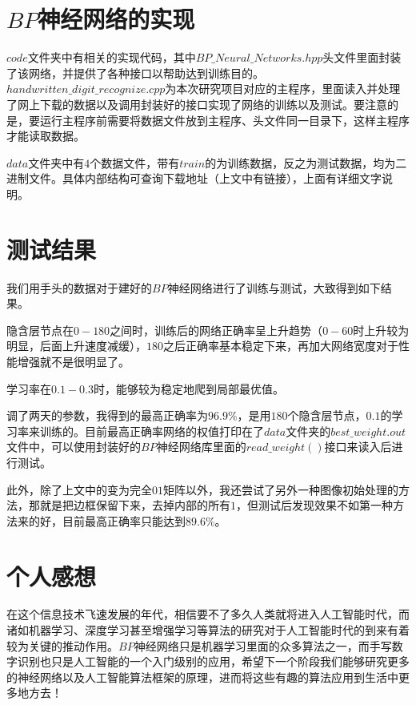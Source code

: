 ﻿\documentclass[UTF8]{ctexart}
\begin{document}
\section{$BP$神经网络的实现}
$code$文件夹中有相关的实现代码，其中$BP\_Neural\_Networks.hpp$头文件里面封装了该网络，并提供了各种接口以帮助达到训练目的。$handwritten\_digit\_recognize.cpp$为本次研究项目对应的主程序，里面读入并处理了网上下载的数据以及调用封装好的接口实现了网络的训练以及测试。要注意的是，要运行主程序前需要将数据文件放到主程序、头文件同一目录下，这样主程序才能读取数据。\par
$data$文件夹中有$4$个数据文件，带有$train$的为训练数据，反之为测试数据，均为二进制文件。具体内部结构可查询下载地址（上文中有链接），上面有详细文字说明。

\section{测试结果}
我们用手头的数据对于建好的$BP$神经网络进行了训练与测试，大致得到如下结果。\par
隐含层节点在$0-180$之间时，训练后的网络正确率呈上升趋势（$0-60$时上升较为明显，后面上升速度减缓），$180$之后正确率基本稳定下来，再加大网络宽度对于性能增强就不是很明显了。\par
学习率在$0.1-0.3$时，能够较为稳定地爬到局部最优值。\par
调了两天的参数，我得到的最高正确率为$96.9\%$，是用$180$个隐含层节点，$0.1$的学习率来训练的。目前最高正确率网络的权值打印在了$data$文件夹的$best\_weight.out$文件中，可以使用封装好的$BP$神经网络库里面的$read\_weight()$接口来读入后进行测试。\par
此外，除了上文中的变为完全$01$矩阵以外，我还尝试了另外一种图像初始处理的方法，那就是把边框保留下来，去掉内部的所有$1$，但测试后发现效果不如第一种方法来的好，目前最高正确率只能达到$89.6\%$。

\section{个人感想}
在这个信息技术飞速发展的年代，相信要不了多久人类就将进入人工智能时代，而诸如机器学习、深度学习甚至增强学习等算法的研究对于人工智能时代的到来有着较为关键的推动作用。$BP$神经网络只是机器学习里面的众多算法之一，而手写数字识别也只是人工智能的一个入门级别的应用，希望下一个阶段我们能够研究更多的神经网络以及人工智能算法框架的原理，进而将这些有趣的算法应用到生活中更多地方去！
\end{document}

